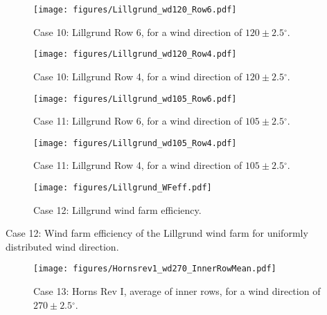 \documentclass[a4paper,oneside]{article}
\newcommand{\degree}{\ensuremath{^\circ}}
\begin{document}
\begin{figure}[h!]
\centering
\texttt{[image: figures/Lillgrund\_wd120\_Row6.pdf]}
\caption{Case 10: Lillgrund Row 6, for a wind direction of $120\pm2.5\degree$.}
\label{fig:Case10Row6}
\end{figure}


\begin{figure}[h!]
\centering
\texttt{[image: figures/Lillgrund\_wd120\_Row4.pdf]}
\caption{Case 10: Lillgrund Row 4, for a wind direction of $120\pm2.5\degree$.}
\label{fig:Case10Row4}
\end{figure}


\begin{figure}[h!]
\centering
\texttt{[image: figures/Lillgrund\_wd105\_Row6.pdf]}
\caption{Case 11: Lillgrund Row 6, for a wind direction of $105\pm2.5\degree$.}
\label{fig:Case11Row6}
\end{figure}


\begin{figure}[h!]
\centering
\texttt{[image: figures/Lillgrund\_wd105\_Row4.pdf]}
\caption{Case 11: Lillgrund Row 4, for a wind direction of $105\pm2.5\degree$.}
\label{fig:Case11Row4}
\end{figure}


\begin{figure}[h!]
\centering
\texttt{[image: figures/Lillgrund\_WFeff.pdf]}
\caption{Case 12: Lillgrund wind farm efficiency.}
\label{fig:Case12}
\end{figure}

\clearpage
\begin{table}[h!]
\centering
\small

\caption{Case 12: Wind farm efficiency of the Lillgrund wind farm for uniformly distributed wind direction.}\label{tab:case12WFeff}
\end{table}


\begin{figure}[h!]
\centering
\texttt{[image: figures/Hornsrev1\_wd270\_InnerRowMean.pdf]}
\caption{Case 13: Horns Rev I, average of inner rows, for a wind direction of $270\pm2.5\degree$.}
\label{fig:Case13}
\end{figure}

  

\end{document}
